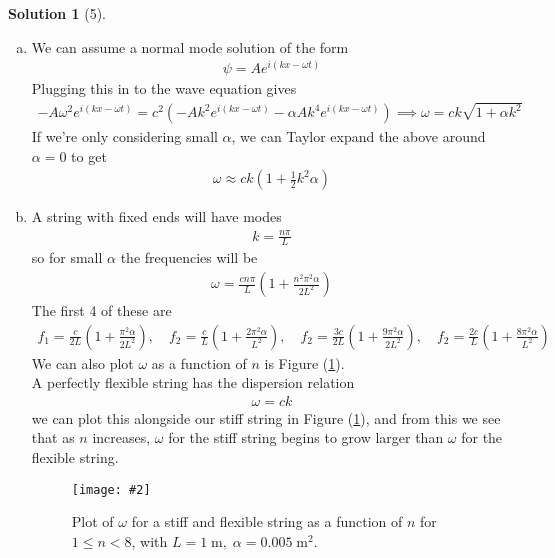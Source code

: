 \documentclass[11pt]{article}
\theoremstyle{definition}
\newtheorem*{solution}{Solution}
\newcommand{\eq}{\begin{equation}\begin{aligned}}
\newcommand{\qe}{\end{aligned}\end{equation}}
\newcommand{\img}[4][0.9\textwidth]{
  \begin{figure}[h]
    \centering
    \texttt{[image: \#2]}
    \caption{#3}
    \label{#4}
  \end{figure}
}
\begin{document}
\begin{solution}[5]
  \begin{enumerate}[(a)]
    \item We can assume a normal mode solution of the form 
    \eq
      \psi=Ae^{i(kx-\omega t)}
    \qe
    Plugging this in to the wave equation gives
    \eq
      -A\omega^2 e^{i(kx-\omega t)}=c^2(-Ak^2e^{i(kx-\omega t)}-\alpha Ak^4e^{i(kx-\omega t)})\implies
      \boxed{\omega=ck\sqrt{1+\alpha k^2}}
    \qe
    If we're only considering small $\alpha$, we can Taylor expand the above around $\alpha=0$ to get
    \eq
      \omega\approx ck\left(1+\frac{1}{2}k^2\alpha\right)
    \qe
    \item A string with fixed ends will have modes
    \eq
      k=\frac{n\pi}{L}
    \qe
    so for small $\alpha$ the frequencies will be
    \eq
      \omega=\frac{cn\pi}{L}\left(1+\frac{n^2\pi^2\alpha}{2L^2}\right)
    \qe
    The first 4 of these are
    \eq
      \boxed{f_1=\frac{c}{2L}\left(1+\frac{\pi^2\alpha}{2L^2}\right),\quad
      f_2=\frac{c}{L}\left(1+\frac{2\pi^2\alpha}{L^2}\right),\quad
      f_2=\frac{3c}{2L}\left(1+\frac{9\pi^2\alpha}{2L^2}\right),\quad
      f_2=\frac{2c}{L}\left(1+\frac{8\pi^2\alpha}{L^2}\right)}
    \qe
    We can also plot $\omega$ as a function of $n$ is Figure (\ref{fig:nfreqs}).\\
    A perfectly flexible string has the dispersion relation
    \eq
      \omega=ck
    \qe
    we can plot this alongside our stiff string in Figure (\ref{fig:nfreqs}), and from this we see that as $n$ increases, $\omega$ for the stiff string begins to grow larger than $\omega$ for the flexible string.
    \img{5b}{Plot of $\omega$ for a stiff and flexible string as a function of $n$ for $1\leq n< 8$, with $L=1\; \text{m},\;\alpha = 0.005\;\text{m}^2$.}{fig:nfreqs}

  \end{enumerate}
\end{solution}
\end{document}
